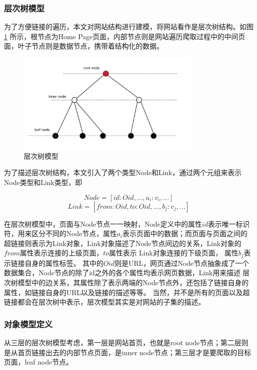 \documentclass[master]{njuthesis}
\begin{document}
\subsubsection{层次树模型}
为了方便链接的遍历，本文对网站结构进行建模，将网站看作是层次树结构\cite{kleinberg1999web}。如图\ref{fig:Htree} 所示，根节点为Home Page页面，内部节点则是网站遍历爬取过程中的中间页面，叶子节点则是数据节点，携带着结构化的数据。

\begin{figure}
\centering
\includegraphics[width=0.8\textwidth]{pic/Htree.png}
\caption{层次树模型} \label{fig:Htree}
\end{figure}


为了描述层次树结构，本文引入了两个类型Node和Link，通过两个元组来表示Node类型和Link类型，即

\[
  Node = [id: Oid, ..., a_i : v_i , ...]
\]
\[
  Link = [from: Oid, to : Oid, ..., b_j : v_j , ...]
\]

在层次树模型中，页面与Node节点一一映射，Node定义中的属性$id$表示唯一标识符，用来区分不同的Node节点，属性$a_i$表示页面中的数据；而页面与页面之间的超链接则表示为Link对象，Link对象描述了Node节点间边的关系，Link对象的$from$属性表示连接的上级页面，$to$属性表示
Link对象连接的下级页面， 属性$b_j$表示链接自身的属性标签。
其中的$Oid$则是URL，网页通过Node节点抽象成了一个数据集合，Node节点的除了id之外的各个属性均表示网页数据，Link用来描述
层次树模型中的边关系，其属性除了表示两端的Node节点外，还包括了链接自身的属性，如链接自身的URL以及链接的描述等等。
当然，并不是所有的页面以及超链接都会在层次树中表示，层次模型其实是对网站的子集的描述。

\subsubsection{对象模型定义}
从三层的层次树模型考虑，第一层是网站首页，也就是root node节点；第二层则是从首页链接出去的内部节点页面，是inner node节点；第三层才是要爬取的目标页面，leaf node节点。
\end{document}
